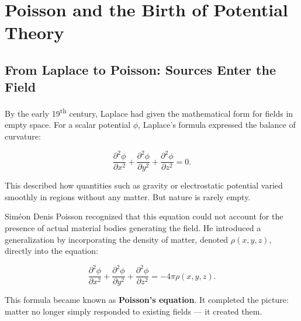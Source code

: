 \section{Poisson and the Birth of Potential Theory}

\subsection{From Laplace to Poisson: Sources Enter the Field}

By the early 19\textsuperscript{th} century, Laplace had given the mathematical form for fields in empty space. For a scalar potential \(\phi\), Laplace's formula expressed the balance of curvature:

\[
\frac{\partial^2 \phi}{\partial x^2} 
+ \frac{\partial^2 \phi}{\partial y^2} 
+ \frac{\partial^2 \phi}{\partial z^2} 
= 0.
\]

This described how quantities such as gravity or electrostatic potential varied smoothly in regions without any matter. But nature is rarely empty.

Siméon Denis Poisson recognized that this equation could not account for the presence of actual material bodies generating the field. He introduced a generalization by incorporating the density of matter, denoted \(\rho(x,y,z)\), directly into the equation:

\[
\frac{\partial^2 \phi}{\partial x^2} 
+ \frac{\partial^2 \phi}{\partial y^2} 
+ \frac{\partial^2 \phi}{\partial z^2} 
= - 4\pi \rho(x,y,z).
\]

This formula became known as \textbf{Poisson’s equation}. It completed the picture: matter no longer simply responded to existing fields — it created them.

